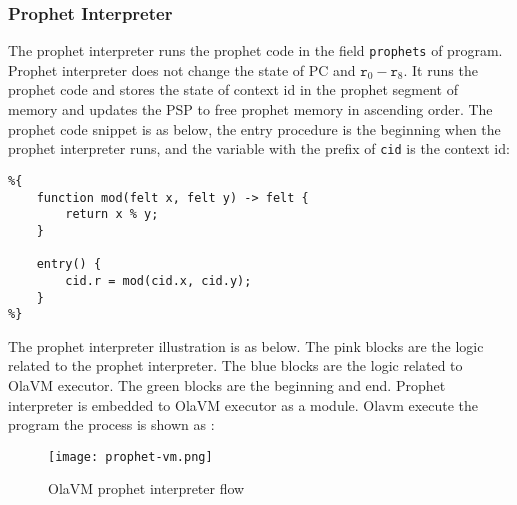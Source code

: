 \subsubsection{Prophet Interpreter}\label{subsec:prophet-interpreter}

The prophet interpreter runs the prophet code in the field \verb|prophets| of program.
Prophet interpreter does not change the state of PC and $\texttt{r}_0 - \texttt{r}_8$.
It runs the prophet code and stores the state of context id in the prophet segment of memory and updates the PSP to free prophet memory in ascending order.
The prophet code snippet is as below, the entry procedure is the beginning when the prophet interpreter runs, and the variable with the prefix of \verb|cid| is the context id:
\begin{lstlisting}
%{
    function mod(felt x, felt y) -> felt {
        return x % y;
    }

    entry() {
        cid.r = mod(cid.x, cid.y);
    }
%}
\end{lstlisting}

The prophet interpreter illustration is as below.
The pink blocks are the logic related to the prophet interpreter.
The blue blocks are the logic related to OlaVM executor.
The green blocks are the beginning and end.
Prophet interpreter is embedded to OlaVM executor as a module.
Olavm execute the program the process is shown as :
\begin{figure}[!htp]
    \centering
    \texttt{[image: prophet-vm.png]}
    \caption{OlaVM prophet interpreter flow}
    \label{fig:prophet-interpreter-logic}
\end{figure}
